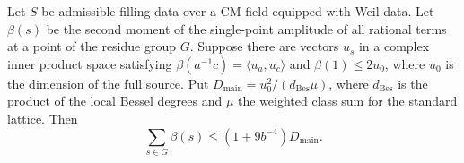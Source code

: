 \begin{lemma}
\label{lem:b-global-moment}
\emitthmsource
Let $S$ be admissible filling data over a CM field equipped with Weil data.
Let $\beta(s)$ be the second moment of the single-point amplitude of all rational terms at a point of the residue group $G$.
Suppose there are vectors $u_s$ in a complex inner product space satisfying
$\beta(a^{-1}c)=\langle u_a,u_c\rangle$ and $\beta(1)\le 2u_0$,
where $u_0$ is the dimension of the full source. Put
$D_{\mathrm{main}}=u_0^2/(d_{\mathrm{Bes}}\mu)$,
where $d_{\mathrm{Bes}}$ is the product of the local Bessel degrees and $\mu$ the weighted class sum for the standard lattice.
Then
\[
 \sum_{s\in G}\beta(s)\le(1+9b^{-4})D_{\mathrm{main}}.
\]
\end{lemma}
